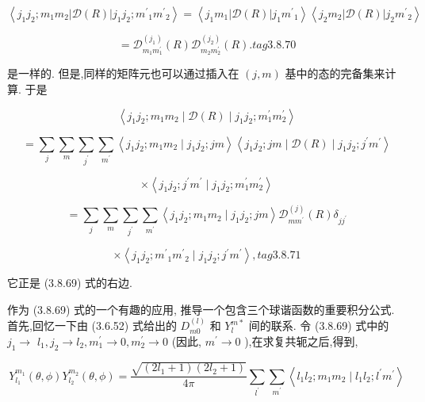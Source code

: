 $$
\left\langle {{j}_{1}{j}_{2};{m}_{1}{m}_{2}\left| {\mathcal{D}\left( R\right) }\right| {j}_{1}{j}_{2};{m}^{\prime }{}_{1}{m}^{\prime }{}_{2}}\right\rangle = \left\langle {{j}_{1}{m}_{1}\left| {\mathcal{D}\left( R\right) }\right| {j}_{1}{m}^{\prime }{}_{1}}\right\rangle \left\langle {{j}_{2}{m}_{2}\left| {\mathcal{D}\left( R\right) }\right| {j}_{2}{m}^{\prime }{}_{2}}\right\rangle
$$

$$
= {\mathcal{D}}_{{m}_{1}{m}_{1}^{\prime }}^{\left( {j}_{1}\right) }\left( R\right) {\mathcal{D}}_{{m}_{2}{m}_{2}^{\prime }}^{\left( {j}_{2}\right) }\left( R\right) . tag{3.8.70}
$$

是一样的. 但是,同样的矩阵元也可以通过插入在 $\left( {j, m}\right)$ 基中的态的完备集来计算. 于是

$$
\left\langle {{j}_{1}{j}_{2};{m}_{1}{m}_{2} \mid \mathcal{D}\left( R\right) \mid {j}_{1}{j}_{2};{m}_{1}^{\prime }{m}_{2}^{\prime }}\right\rangle
$$

$$
= \mathop{\sum }\limits_{j}\mathop{\sum }\limits_{m}\mathop{\sum }\limits_{{j}^{\prime }}\mathop{\sum }\limits_{{m}^{\prime }}\left\langle {{j}_{1}{j}_{2};{m}_{1}{m}_{2} \mid {j}_{1}{j}_{2};{jm}}\right\rangle \left\langle {{j}_{1}{j}_{2};{jm} \mid \mathcal{D}\left( R\right) \mid {j}_{1}{j}_{2};{j}^{\prime }{m}^{\prime }}\right\rangle
$$

$$
\times \left\langle {{j}_{1}{j}_{2};{j}^{\prime }{m}^{\prime } \mid {j}_{1}{j}_{2};{m}_{1}^{\prime }{m}_{2}^{\prime }}\right\rangle
$$

$$
= \mathop{\sum }\limits_{j}\mathop{\sum }\limits_{m}\mathop{\sum }\limits_{{j}^{\prime }}\mathop{\sum }\limits_{{m}^{\prime }}\left\langle {{j}_{1}{j}_{2};{m}_{1}{m}_{2} \mid {j}_{1}{j}_{2};{jm}}\right\rangle {\mathcal{D}}_{m{m}^{\prime }}^{\left( j\right) }\left( R\right) {\delta }_{j{j}^{\prime }}
$$

$$
\times \left\langle {{j}_{1}{j}_{2};{m}^{\prime }{}_{1}{m}^{\prime }{}_{2} \mid {j}_{1}{j}_{2};{j}^{\prime }{m}^{\prime }}\right\rangle , tag{3.8.71}
$$

它正是 (3.8.69) 式的右边.

作为 (3.8.69) 式的一个有趣的应用, 推导一个包含三个球谐函数的重要积分公式. 首先,回忆一下由 (3.6.52) 式给出的 ${D}_{m0}^{\left( l\right) }$ 和 ${Y}_{l}^{m * }$ 间的联系. 令 (3.8.69) 式中的 ${j}_{1} \rightarrow$ ${l}_{1},{j}_{2} \rightarrow {l}_{2},{m}_{1}^{\prime } \rightarrow 0,{m}_{2}^{\prime } \rightarrow 0$ (因此, ${m}^{\prime } \rightarrow 0$ ),在求复共轭之后,得到,

$$
{Y}_{{l}_{1}}^{{m}_{1}}\left( {\theta ,\phi }\right) {Y}_{{l}_{2}}^{{m}_{2}}\left( {\theta ,\phi }\right) = \frac{\sqrt{\left( {2{l}_{1} + 1}\right) \left( {2{l}_{2} + 1}\right) }}{4\pi }\mathop{\sum }\limits_{{l}^{\prime }}\mathop{\sum }\limits_{{m}^{\prime }}\left\langle {{l}_{1}{l}_{2};{m}_{1}{m}_{2} \mid {l}_{1}{l}_{2};{l}^{\prime }{m}^{\prime }}\right\rangle
$$

